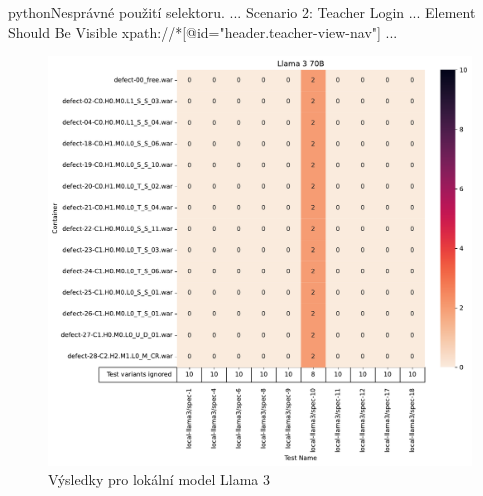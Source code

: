 \documentclass[czech, ma, kiv, he, iso690numb, pdf, viewonly]{fasthesis}
\begin{document}
            \begin{code}{python}{Nesprávné použití selektoru. \label{lst:wrong_selector}}
                ...
                Scenario 2: Teacher Login
                ...
                Element Should Be Visible    xpath://*[@id="header.teacher-view-nav"]
            ...            \end{code}

            \begin{figure}[H]
                \includegraphics[width=\textwidth]{pic/llama-3-results.pdf}
                \caption{Výsledky pro lokální model Llama 3}
                \label{fig:res:llama3}
            \end{figure}
\end{document}
